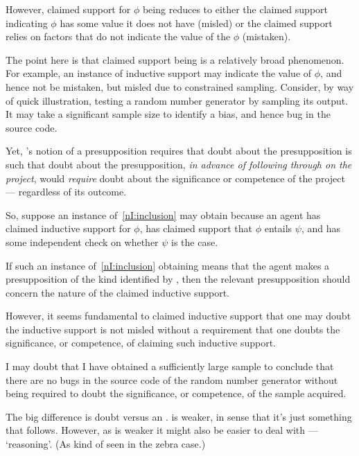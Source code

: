 \begin{note}
  However, claimed support for \(\phi\) being \mom{} reduces to either the claimed support indicating \(\phi\) has some value it does not have (misled) or the claimed support relies on factors that do not indicate the value of the \(\phi\) (mistaken).

  The point here is that claimed support being \mom{} is a relatively broad phenomenon.
  For example, an instance of inductive support may indicate the value of \(\phi\), and hence not be mistaken, but misled due to constrained sampling.
  Consider, by way of quick illustration, testing a random number generator by sampling its output.
  It may take a significant sample size to identify a bias, and hence bug in the source code.

  Yet, \citeauthor{Wright:2011wn}'s notion of a presupposition requires that doubt about the presupposition is such that doubt about the presupposition, \emph{in advance of following through on the project}, would \emph{require} doubt about the significance or competence of the project --- regardless of its outcome.

  So, suppose an instance of~\ref{nI:inclusion} may obtain because an agent has claimed inductive support for \(\phi\), has claimed support that \(\phi\) entails \(\psi\), and has some independent check on whether \(\psi\) is the case.

  If such an instance of~\ref{nI:inclusion} obtaining means that the agent makes a presupposition of the kind identified by \wrt{}, then the relevant presupposition should concern the nature of the claimed inductive support.

  However, it seems fundamental to claimed inductive support that one may doubt the inductive support is not misled without a requirement that one doubts the significance, or competence, of claiming such inductive support.

  I may doubt that I have obtained a sufficiently large sample to conclude that there are no bugs in the source code of the random number generator without being required to doubt the significance, or competence, of the sample acquired.
\end{note}

\begin{note}
  \color{red}
  The big difference is doubt versus an \requ{}.
   is weaker, in sense that it's just something that follows.
  However, as \requ{} is weaker it might also be easier to deal with --- `reasoning'.
  (As kind of seen in the zebra case.)
\end{note}

